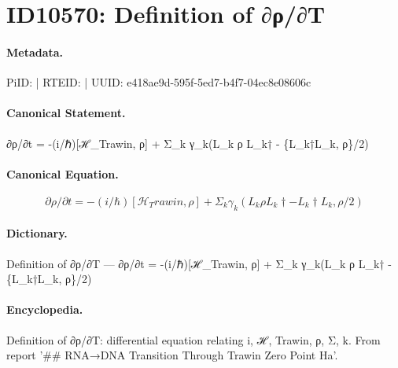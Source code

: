 \section*{ID10570: Definition of ∂ρ/∂T}
\paragraph{Metadata.}
PiID:  | RTEID:  | UUID: e418ae9d-595f-5ed7-b4f7-04ec8e08606c

\paragraph{Canonical Statement.}
∂ρ/∂t = -(i/ℏ)[ℋ\_Trawin, ρ] + Σ\_k γ\_k(L\_k ρ L\_k† - \{L\_k†L\_k, ρ\}/2)

\paragraph{Canonical Equation.}
\[
∂ρ/∂t = -(i/ℏ)[ℋ_Trawin, ρ] + Σ_k γ_k(L_k ρ L_k† - {L_k†L_k, ρ}/2)
\]

\paragraph{Dictionary.}
Definition of ∂ρ/∂T — ∂ρ/∂t = -(i/ℏ)[ℋ\_Trawin, ρ] + Σ\_k γ\_k(L\_k ρ L\_k† - \{L\_k†L\_k, ρ\}/2)

\paragraph{Encyclopedia.}
Definition of ∂ρ/∂T: differential equation relating i, ℋ, Trawin, ρ, Σ, k. From report '\#\# RNA→DNA Transition Through Trawin Zero Point Ha'.
